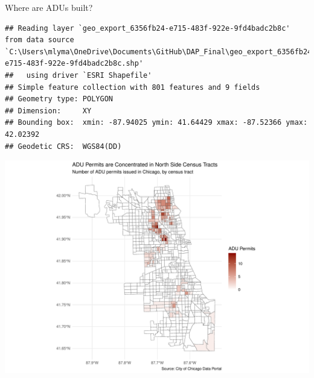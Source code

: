 \documentclass[
  ignorenonframetext,
]{beamer}
\begin{document}
\begin{frame}[fragile]{Where are ADUs built?}
\protect\hypertarget{where-are-adus-built}{}
\begin{verbatim}
## Reading layer `geo_export_6356fb24-e715-483f-922e-9fd4badc2b8c' from data source `C:\Users\mlyma\OneDrive\Documents\GitHub\DAP_Final\geo_export_6356fb24-e715-483f-922e-9fd4badc2b8c.shp' 
##   using driver `ESRI Shapefile'
## Simple feature collection with 801 features and 9 fields
## Geometry type: POLYGON
## Dimension:     XY
## Bounding box:  xmin: -87.94025 ymin: 41.64429 xmax: -87.52366 ymax: 42.02392
## Geodetic CRS:  WGS84(DD)
\end{verbatim}

\includegraphics{Slides_files/figure-beamer/unnamed-chunk-2-1.pdf}
\end{frame}

\begin{frame}
\end{frame}
\end{document}
